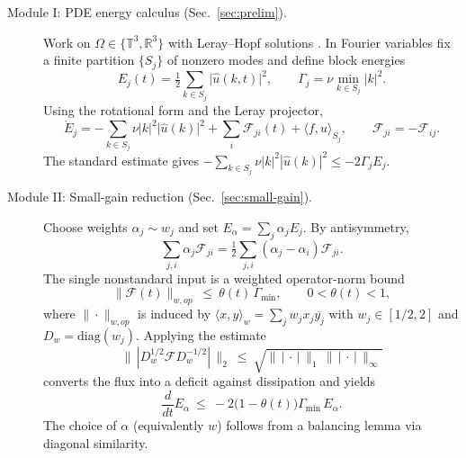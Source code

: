 \IfFileExists{nyjm.cls}{\documentclass[11pt]{nyjm}}{\documentclass[11pt]{amsart}}
\newcommand{\R}{\mathbb{R}}
\newcommand{\T}{\mathbb{T}}
\theoremstyle{plain}
\theoremstyle{definition}
\theoremstyle{remark}
\begin{document}
\begin{description}
  \item[Module I: PDE energy calculus (Sec.~\ref{sec:prelim}).]
  Work on $\Omega\in\{\T^3,\R^3\}$ with Leray--Hopf solutions \cite{Leray1934}. In Fourier variables fix a finite partition $\{S_j\}$ of nonzero modes and define block energies
  \[
    E_j(t)=\tfrac12\sum_{k\in S_j}\bigl|\hat u(k,t)\bigr|^2,\qquad
    \Gamma_j=\nu\min_{k\in S_j}|k|^2.
  \]
  Using the rotational form and the Leray projector,
  \[
    \dot E_j
    = -\sum_{k\in S_j}\nu|k|^2\bigl|\hat u(k)\bigr|^2 + \sum_i \mathcal F_{ji}(t) + \langle f,u\rangle_{S_j},
    \qquad \mathcal F_{ji}=-\mathcal F_{ij}.
  \]
  The standard estimate gives $-\sum_{k\in S_j}\nu|k|^2|\hat u(k)|^2 \le -2\Gamma_j E_j$.

  \item[Module II: Small-gain reduction (Sec.~\ref{sec:small-gain}).]
  Choose weights $\alpha_j\sim w_j$ and set $E_\alpha=\sum_j\alpha_jE_j$. By antisymmetry,
  \[
    \sum_{j,i}\alpha_j\mathcal F_{ji}=\tfrac12\sum_{j,i}(\alpha_j-\alpha_i)\mathcal F_{ji}.
  \]
  The single nonstandard input is a weighted operator-norm bound
  \[
    \|\mathcal F(t)\|_{w,op}\ \le\ \theta(t)\,\Gamma_{\min},\qquad 0<\theta(t)<1,
  \]
  where $\|\cdot\|_{w,op}$ is induced by $\langle x,y\rangle_w=\sum_j w_j x_j\overline{y_j}$ with $w_j\in[1/2,2]$ and $D_w=\mathrm{diag}(w_j)$. Applying the estimate
  \[
    \bigl\|\,|D_w^{1/2}\mathcal F D_w^{-1/2}|\,\bigr\|_2\ \le\ \sqrt{\bigl\|\,|\,\cdot\,|\,\bigr\|_1\,\bigl\|\,|\,\cdot\,|\,\bigr\|_\infty}
  \]
  converts the flux into a deficit against dissipation and yields
  \[
    \frac{d}{dt}E_\alpha \ \le\ -2\bigl(1-\theta(t)\bigr)\Gamma_{\min}\,E_\alpha.
  \]
  The choice of $\alpha$ (equivalently $w$) follows from a balancing lemma via diagonal similarity.


\end{description}
\end{document}
